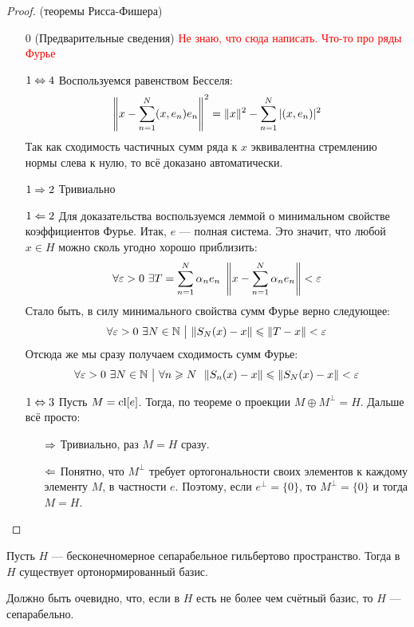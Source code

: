 \begin{proof} (теоремы Рисса-Фишера)
	\begin{itemize}
		\item[$0$] (Предварительные сведения) \textcolor{red}{Не знаю, что сюда написать. Что-то про ряды Фурье}
		
		\item[$1 \Leftrightarrow  4$] Воспользуемся равенством Бесселя:
		\[
			\left\|x - \sum_{n = 1}^N (x, e_n)e_n\right\|^2 = \|x\|^2 - \sum_{n = 1}^N |(x, e_n)|^2
		\]
		Так как сходимость частичных сумм ряда к $x$ эквивалентна стремлению нормы слева к нулю, то всё доказано автоматически.
		
		\item[$1 \Rightarrow 2$] Тривиально
		
		\item[$1 \Leftarrow 2$] Для доказательства воспользуемся леммой о минимальном свойстве коэффициентов Фурье. Итак, $e$ --- полная система. Это значит, что любой $x \in H$ можно сколь угодно хорошо приблизить:
		\[
			\forall \varepsilon > 0\ \exists T = \sum_{n = 1}^N \alpha_n e_n\ \left\|x - \sum_{n = 1}^N \alpha_n e_n\right\| < \varepsilon
		\]
		Стало быть, в силу минимального свойства сумм Фурье верно следующее:
		\[
			\forall \varepsilon > 0\ \exists N \in \mathbb{N} \ \big|\  \|S_N(x) - x\| \leqslant \|T - x\| < \varepsilon
		\]
		Отсюда же мы сразу получаем сходимость сумм Фурье:
		\[
			\forall \varepsilon > 0\ \exists N \in \mathbb{N} \ \big|\  \forall n \geqslant N\ \ \|S_n(x) - x\| \leqslant \|S_N(x) - x\| < \varepsilon
		\]
	
		\item[$1 \Leftrightarrow 3$] Пусть $M = \operatorname{cl} [e]$. Тогда, по теореме о проекции $M \oplus M^\bot = H$. Дальше всё просто:
		\begin{itemize}
			\item[$\Rightarrow$] Тривиально, раз $M = H$ сразу.
			
			\item[$\Leftarrow$] Понятно, что $M^\bot$ требует ортогональности своих элементов к каждому элементу $M$, в частности $e$. Поэтому, если $e^\bot = \{0\}$, то $M^\bot = \{0\}$ и тогда $M = H$.
		\end{itemize}
	\end{itemize}
\end{proof}

\begin{theorem}
	Пусть $H$ --- бесконечномерное сепарабельное гильбертово пространство. Тогда в $H$ существует ортонормированный базис.
\end{theorem}

\begin{note}
	Должно быть очевидно, что, если в $H$ есть не более чем счётный базис, то $H$ --- сепарабельно.
\end{note}

